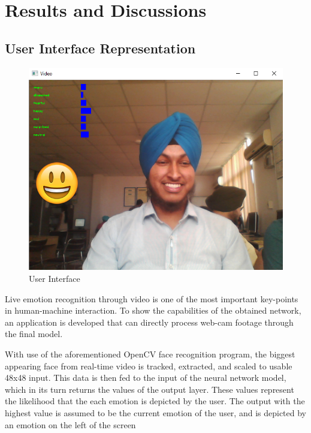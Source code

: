 \chapter{Results and Discussions}
\section{User Interface Representation}
\begin{figure}[h]
	\centering\includegraphics[scale=0.74]{images/ui.png}
	\caption{User Interface}
\end{figure}
Live emotion recognition through video is one of the most important key-points in human-machine interaction. To show the capabilities of the obtained network, an application is developed that can directly process web-cam footage through the final model.

With use of the aforementioned OpenCV face recognition program, the biggest appearing face from real-time video is tracked, extracted, and scaled to usable 48x48 input. This data is then fed to the input of the neural network model, which in its turn returns the values of the output layer. These values represent the likelihood that the each emotion is depicted by the user. The output with the highest value is assumed to be the current emotion of the user, and is depicted by an emotion on the left of the screen
\pagebreak

